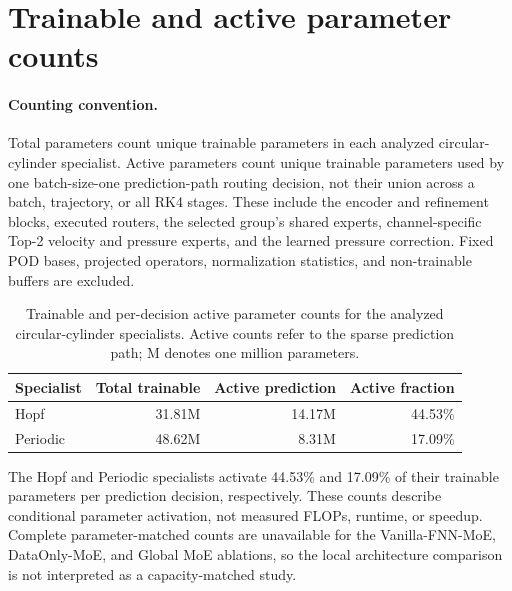 \section{Trainable and active parameter counts}
\label{app:parameter_counts}

\paragraph{Counting convention.}
Total parameters count unique trainable parameters in each analyzed
circular-cylinder specialist. Active parameters count unique trainable
parameters used by one batch-size-one prediction-path routing decision,
not their union across a batch, trajectory, or all RK4 stages. These include
the encoder and refinement blocks, executed routers, the selected group's
shared experts, channel-specific Top-2 velocity and pressure experts, and
the learned pressure correction. Fixed POD bases, projected operators,
normalization statistics, and non-trainable buffers are excluded.

\par
\begin{table}[H]
\centering
\caption{Trainable and per-decision active parameter counts for the analyzed
circular-cylinder specialists. Active counts refer to the sparse prediction
path; M denotes one million parameters.}
\label{tab:parameter_counts}
\begin{tabular}{lrrr}
\toprule
Specialist & Total trainable & Active prediction & Active fraction \\
\midrule
Hopf & 31.81M & 14.17M & 44.53\% \\
Periodic & 48.62M & 8.31M & 17.09\% \\
\bottomrule
\end{tabular}
\end{table}
\par

The Hopf and Periodic specialists activate 44.53\% and 17.09\% of their
trainable parameters per prediction decision, respectively. These counts
describe conditional parameter activation, not measured FLOPs, runtime,
or speedup. Complete parameter-matched counts are unavailable for the
Vanilla-FNN-MoE, DataOnly-MoE, and Global MoE ablations, so the local
architecture comparison is not interpreted as a capacity-matched study.
